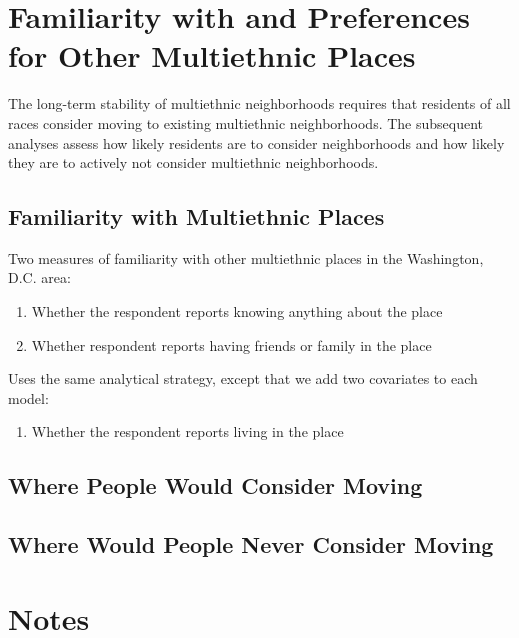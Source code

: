 \documentclass{baderart}
\providecommand{\tightlist}{%
  \setlength{\itemsep}{0pt}\setlength{\parskip}{0pt}}
\begin{document}
\section{Familiarity with and Preferences for Other Multiethnic Places}\label{familiarity-with-and-preferences-for-other-multiethnic-places}

The long-term stability of multiethnic neighborhoods requires that residents of all races consider moving to existing multiethnic neighborhoods. The subsequent analyses assess how likely residents are to consider neighborhoods and how likely they are to actively not consider multiethnic neighborhoods.

\subsection{Familiarity with Multiethnic Places}\label{familiarity-with-multiethnic-places}

Two measures of familiarity with other multiethnic places in the Washington, D.C. area:

\begin{enumerate} \def\labelenumi{\arabic{enumi}.} \tightlist \item   Whether the respondent reports knowing anything about the place \item   Whether respondent reports having friends or family in the place \end{enumerate}

Uses the same analytical strategy, except that we add two covariates to each model:

\begin{enumerate} \def\labelenumi{\arabic{enumi}.} \tightlist \item   Whether the respondent reports living in the place \end{enumerate}

\subsection{Where People Would Consider Moving}\label{where-people-would-consider-moving}

\subsection{Where Would People Never Consider Moving}\label{where-would-people-never-consider-moving}

\section{Notes}\label{notes}
\end{document}
